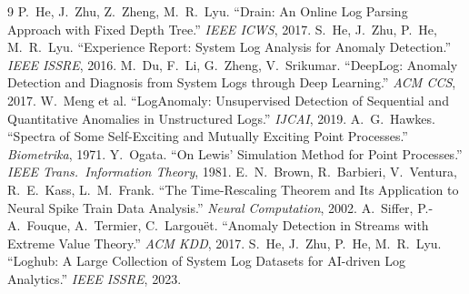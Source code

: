 \documentclass[11pt,a4paper]{article}
\begin{document}
\begin{thebibliography}{9}
\small
{} P.~He, J.~Zhu, Z.~Zheng, M.~R.~Lyu. ``Drain: An Online Log Parsing
Approach with Fixed Depth Tree.'' \emph{IEEE ICWS}, 2017.
 S.~He, J.~Zhu, P.~He, M.~R.~Lyu. ``Experience Report: System
Log Analysis for Anomaly Detection.'' \emph{IEEE ISSRE}, 2016.
 M.~Du, F.~Li, G.~Zheng, V.~Srikumar. ``DeepLog: Anomaly
Detection and Diagnosis from System Logs through Deep Learning.'' \emph{ACM CCS},
2017.
 W.~Meng et al. ``LogAnomaly: Unsupervised Detection of
Sequential and Quantitative Anomalies in Unstructured Logs.'' \emph{IJCAI}, 2019.
 A.~G.~Hawkes. ``Spectra of Some Self-Exciting and Mutually
Exciting Point Processes.'' \emph{Biometrika}, 1971.
 Y.~Ogata. ``On Lewis' Simulation Method for Point Processes.''
\emph{IEEE Trans.\ Information Theory}, 1981.
 E.~N.~Brown, R.~Barbieri, V.~Ventura, R.~E.~Kass,
L.~M.~Frank. ``The Time-Rescaling Theorem and Its Application to Neural Spike Train
Data Analysis.'' \emph{Neural Computation}, 2002.
 A.~Siffer, P.-A.~Fouque, A.~Termier, C.~Largou\"et. ``Anomaly
Detection in Streams with Extreme Value Theory.'' \emph{ACM KDD}, 2017.
 S.~He, J.~Zhu, P.~He, M.~R.~Lyu. ``Loghub: A Large Collection of
System Log Datasets for AI-driven Log Analytics.'' \emph{IEEE ISSRE}, 2023.
\end{thebibliography}
\end{document}

